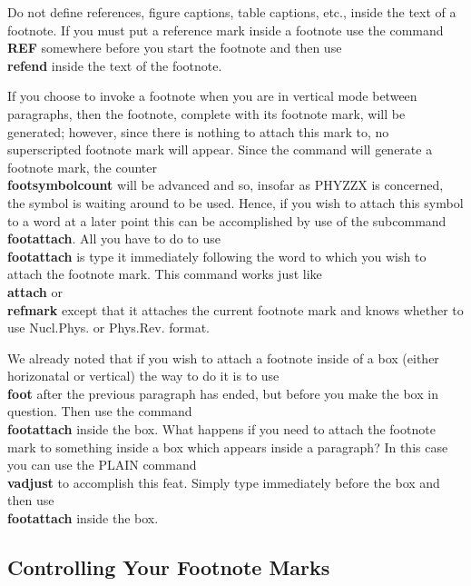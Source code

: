 \pointbegin
Do not define references, figure captions, table captions, etc.,
inside the text of a footnote.
If you must put a reference mark inside a footnote use the command
{\bf \\REF} somewhere before you start the footnote and then
use {\bf \\refend} inside the text of the footnote.
 
\point
If you choose to invoke a footnote when you are in vertical mode
between paragraphs, then the footnote, complete with its footnote
mark, will be generated; however, since there is nothing to
attach this mark to, no superscripted footnote mark will appear.
Since the command will generate a footnote mark, the counter
{\bf \\footsymbolcount} will be advanced and so, insofar as PHYZZX
is concerned, the symbol is waiting around to be used.
Hence, if you wish to attach this symbol to a word at a later point
this can be accomplished by use of the subcommand {\bf \\footattach}.
All you have to do to use {\bf \\footattach} is type it immediately
following the word to which you wish to attach the footnote mark.
This command works just like {\bf \\attach} or {\bf \\refmark}
except that it attaches the current footnote mark and knows whether
to use Nucl.Phys. or Phys.Rev. format.
 
\point
We already noted that if you wish to attach a footnote
inside of a box (either horizonatal or vertical)
the way to do it is to use {\bf \\foot} after the previous paragraph
has ended, but before you make the box in question.
Then use the command {\bf \\footattach} inside the box.
What happens if you need to attach the footnote mark
to something inside a box which appears inside a paragraph?
In this case you can use the PLAIN command {\bf \\vadjust}
to accomplish this feat.
Simply type
immediately before the box and then use {\bf \\footattach} inside
the box.
 
\subsection{Controlling Your Footnote Marks}
 
